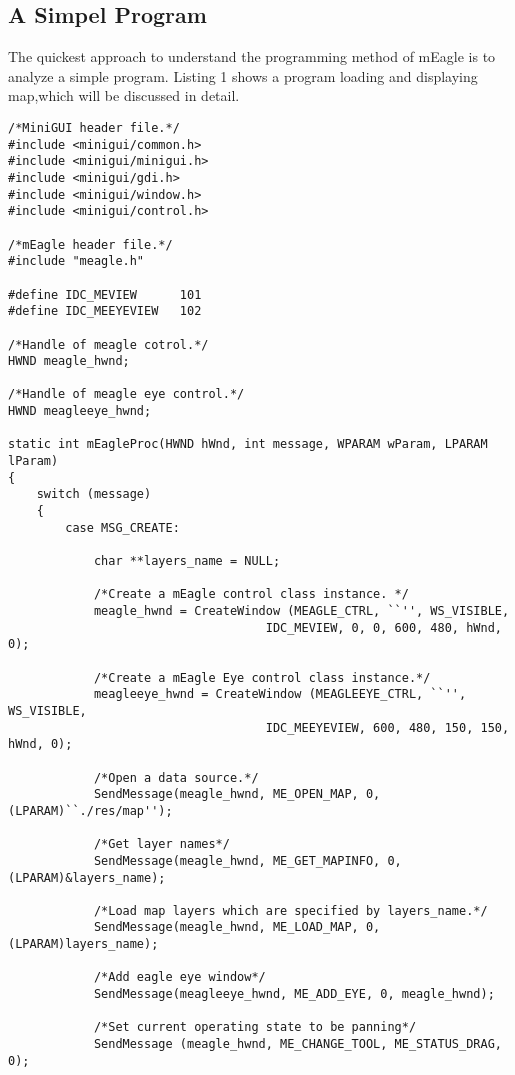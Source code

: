 \documentclass[a4paper]{article}
\begin{document}
\subsection{A Simpel Program}
The quickest approach to understand the programming method of mEagle is to analyze a simple program. Listing 1 shows a program loading and displaying map,which will be discussed in detail. \\
\begin{lstlisting}[frame=trbl,caption=A Simple Program]
/*MiniGUI header file.*/
#include <minigui/common.h>
#include <minigui/minigui.h>
#include <minigui/gdi.h>
#include <minigui/window.h>
#include <minigui/control.h>

/*mEagle header file.*/
#include "meagle.h"

#define IDC_MEVIEW      101
#define IDC_MEEYEVIEW   102

/*Handle of meagle cotrol.*/
HWND meagle_hwnd;

/*Handle of meagle eye control.*/
HWND meagleeye_hwnd;

static int mEagleProc(HWND hWnd, int message, WPARAM wParam, LPARAM lParam)
{
    switch (message) 
    {
        case MSG_CREATE:

            char **layers_name = NULL;

            /*Create a mEagle control class instance. */
            meagle_hwnd = CreateWindow (MEAGLE_CTRL, ``'', WS_VISIBLE, 
                                    IDC_MEVIEW, 0, 0, 600, 480, hWnd, 0); 

            /*Create a mEagle Eye control class instance.*/
            meagleeye_hwnd = CreateWindow (MEAGLEEYE_CTRL, ``'', WS_VISIBLE, 
                                    IDC_MEEYEVIEW, 600, 480, 150, 150, hWnd, 0);

            /*Open a data source.*/
            SendMessage(meagle_hwnd, ME_OPEN_MAP, 0, (LPARAM)``./res/map'');

            /*Get layer names*/
            SendMessage(meagle_hwnd, ME_GET_MAPINFO, 0, (LPARAM)&layers_name);

            /*Load map layers which are specified by layers_name.*/
            SendMessage(meagle_hwnd, ME_LOAD_MAP, 0, (LPARAM)layers_name);

            /*Add eagle eye window*/
            SendMessage(meagleeye_hwnd, ME_ADD_EYE, 0, meagle_hwnd);

            /*Set current operating state to be panning*/
            SendMessage (meagle_hwnd, ME_CHANGE_TOOL, ME_STATUS_DRAG, 0);


\end{lstlisting}
\end{document}
